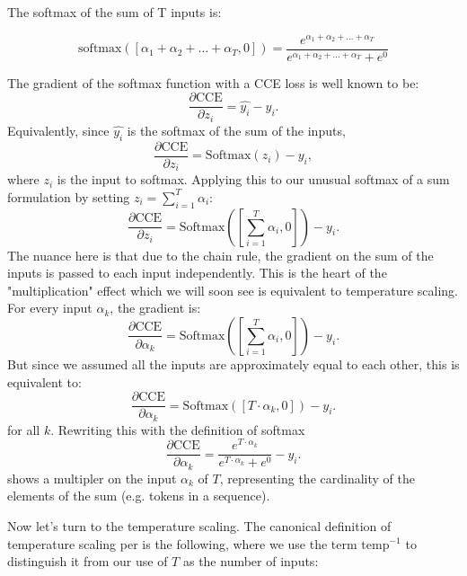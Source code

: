 \documentclass[twoside,11pt]{article}
\begin{document}
The softmax of the sum of T inputs is:

\[
  \text{softmax}(
                 [\alpha_1 + \alpha_2 + \ldots + \alpha_T, 0])
  = 
  \frac{e^{\alpha_1 + \alpha_2 + \ldots + \alpha_T}}{e^{\alpha_1 + \alpha_2 + \ldots + \alpha_T} + e^0}
\]

The gradient of the softmax function with a CCE loss is well known to be:
\[
  \frac{\partial \text{CCE}}{\partial z_i} = \hat{y_i} - y_i.
\] 
Equivalently, since $\hat{y_i}$ is the softmax of the sum of the inputs,
\[
  \frac{\partial \text{CCE}}{\partial z_i} = \text{Softmax}(z_i) - y_i,
\] where $z_i$ is the input to softmax. 
Applying this to our unusual softmax of a sum formulation by setting 
$z_i = \sum_{i=1}^T \alpha_i$:
\[
  \frac{\partial \text{CCE}}{\partial z_i} = \text{Softmax}([\sum_{i=1}^T \alpha_i, 0]) - y_i.
\] The nuance here is that due to the chain rule, the gradient on the 
sum of the inputs is passed to each input independently. This is the heart 
of the "multiplication" effect which we will soon see is equivalent to temperature scaling.
For every input $\alpha_k$, the gradient is:
\[
  \frac{\partial \text{CCE}}{\partial \alpha_k} = \text{Softmax}([\sum_{i=1}^T \alpha_i, 0]) - y_i.
\]
But since we assumed all the inputs are approximately equal to each other,
this is equivalent to:
\[
  \frac{\partial \text{CCE}}{\partial \alpha_k} = \text{Softmax}([T \cdot \alpha_k, 0]) - y_i.
\] for all $k$. Rewriting this with the definition of softmax
\begin{equation}
  \label{eq:softmax-sum}
  \frac{\partial \text{CCE}}{\partial \alpha_k} = \frac{e^{T \cdot \alpha_k}}{e^{T \cdot \alpha_k} + e^0} - y_i.
\end{equation} shows a multipler on the input $\alpha_k$ of $T$, representing the cardinality 
of the elements of the sum (e.g. tokens in a sequence). 

Now let's turn to the temperature scaling. The canonical definition of temperature scaling 
per \cite[Equation~2]{hinton2015distilling} is the following, where we use the term
$\mathrm{temp}^{-1}$ to distinguish it from our use of $T$ as the number
of inputs:
\end{document}
